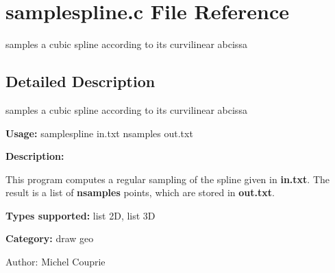 \section{samplespline.c File Reference}
\label{samplespline_8c}
samples a cubic spline according to its curvilinear abcissa  




\label{_details}
\subsection{Detailed Description}
samples a cubic spline according to its curvilinear abcissa 

{\bf Usage:} samplespline in.txt nsamples out.txt

{\bf Description:}

This program computes a regular sampling of the spline given in {\bf in.txt}. The result is a list of {\bf nsamples} points, which are stored in {\bf out.txt}.

{\bf Types supported:} list 2D, list 3D

{\bf Category:} draw geo

\begin{Desc}
\item[Author:]Michel Couprie \end{Desc}

